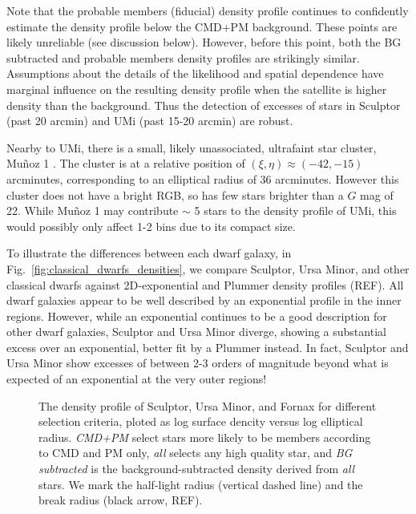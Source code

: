 Note that the probable members (fiducial) density profile continues to
confidently estimate the density profile below the CMD+PM background.
These points are likely unreliable (see discussion below). However,
before this point, both the BG subtracted and probable members density
profiles are strikingly similar. Assumptions about the details of the
likelihood and spatial dependence have marginal influence on the
resulting density profile when the satellite is higher density than the
background. Thus the detection of excesses of stars in Sculptor (past 20
arcmin) and UMi (past 15-20 arcmin) are robust.

Nearby to UMi, there is a small, likely unassociated, ultrafaint star
cluster, Muñoz 1 \citep{munoz+2012}. The cluster is at a relative
position of \((\xi, \eta) \approx(-42, -15)\) arcminutes, corresponding
to an elliptical radius of 36 arcminutes. However this cluster does not
have a bright RGB, so has few stars brighter than a \(G\) mag of 22.
While Muñoz 1 may contribute \(\sim\) 5 stars to the density profile of
UMi, this would possibly only affect 1-2 bins due to its compact size.

To illustrate the differences between each dwarf galaxy, in
Fig.~\ref{fig:classical_dwarfs_densities}, we compare Sculptor, Ursa
Minor, and other classical dwarfs against 2D-exponential and Plummer
density profiles (REF). All dwarf galaxies appear to be well described
by an exponential profile in the inner regions. However, while an
exponential continues to be a good description for other dwarf galaxies,
Sculptor and Ursa Minor diverge, showing a substantial excess over an
exponential, better fit by a Plummer instead. In fact, Sculptor and Ursa
Minor show excesses of between 2-3 orders of magnitude beyond what is
expected of an exponential at the very outer regions!

\begin{figure}
\centering
{}
\caption[Sculptor density profiles]{The density profile of Sculptor,
Ursa Minor, and Fornax for different selection criteria, ploted as log
surface dencity versus log elliptical radius. \emph{CMD+PM} select stars
more likely to be members according to CMD and PM only, \emph{all}
selects any high quality star, and \emph{BG subtracted} is the
background-subtracted density derived from \emph{all} stars. We mark the
half-light radius (vertical dashed line) and the break radius (black
arrow, REF).}\label{fig:scl_observed_profiles}
\end{figure}

